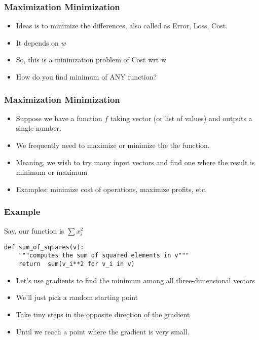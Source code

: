 \begin{frame}[fragile]\frametitle{Maximization Minimization}
\begin{itemize}
\item  Ideas is to minimize the differences, also called as Error, Loss, Cost.
\item It depends on $w$
\item So, this is a minimzation problem of Cost wrt w
\item How do you find minimum of ANY function?
\end{itemize}
\end{frame}


\begin{frame}[fragile]\frametitle{Maximization Minimization}
\begin{itemize}
\item  Suppose we have a function $f$ taking vector (or list of values) and outputs a single number.
\item We frequently need to maximize or minimize the the function.
\item Meaning, we wish to try many input vectors and find one where the result is minimum or maximum
\item Examples: minimize cost of operations, maximize profits, etc.
\end{itemize}
\end{frame}

\begin{frame}[fragile]\frametitle{Example}
Say, our function is $\sum x_i ^2$
\begin{lstlisting}
def sum_of_squares(v):
	"""computes	the sum of squared elements in v"""
	return	sum(v_i**2 for v_i in v)
\end{lstlisting}
\begin{itemize}
\item Let's use gradients to find the minimum among all three-dimensional vectors
\item We'll just pick a random starting point 
\item Take tiny steps in the opposite direction of the gradient 
\item Until we reach a point where the gradient is very small.
\end{itemize}
\end{frame}

